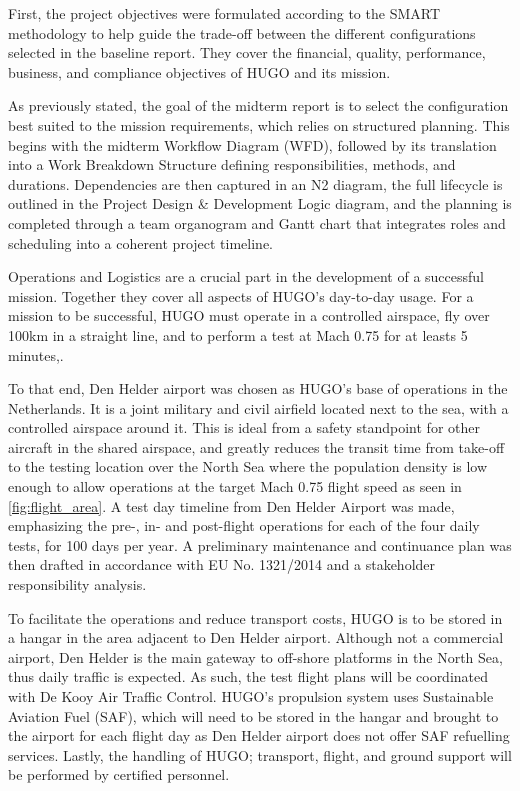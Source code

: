 First, the project objectives were formulated according to the SMART methodology to help guide the trade-off between the different configurations selected in the baseline report. They cover the financial, quality, performance, business, and compliance objectives of HUGO and its mission.

As previously stated, the goal of the midterm report is to select the configuration best suited to the mission requirements, which relies on structured planning. This begins with the midterm Workflow Diagram (WFD), followed by its translation into a Work Breakdown Structure defining responsibilities, methods, and durations. Dependencies are then captured in an N2 diagram, the full lifecycle is outlined in the Project Design \& Development Logic diagram, and the planning is completed through a team organogram and Gantt chart that integrates roles and scheduling into a coherent project timeline.

Operations and Logistics are a crucial part in the development of a successful mission. Together they cover all aspects of HUGO's day-to-day usage. For a mission to be successful, HUGO must operate in a controlled airspace, fly over 100km in a straight line, and to perform a test at Mach 0.75 for at leasts 5 minutes,.

To that end, Den Helder airport was chosen as HUGO's base of operations in the Netherlands. It is a joint military and civil airfield located next to the sea, with a controlled airspace around it. This is ideal from a safety standpoint for other aircraft in the shared airspace, and greatly reduces the transit time from take-off to the testing location over the North Sea where the population density is low enough to allow operations at the target Mach 0.75 flight speed as seen in \autoref{fig:flight_area}. A test day timeline from Den Helder Airport was made, emphasizing the pre-, in- and post-flight operations for each of the four daily tests, for 100 days per year. A preliminary maintenance and continuance plan was then drafted in accordance with EU No. 1321/2014 and a stakeholder responsibility analysis.

To facilitate the operations and reduce transport costs, HUGO is to be stored in a hangar in the area adjacent to Den Helder airport. Although not a commercial airport, Den Helder is the main gateway to off-shore platforms in the North Sea, thus daily traffic is expected. As such, the test flight plans will be coordinated with De Kooy Air Traffic Control. HUGO's propulsion system uses Sustainable Aviation Fuel (SAF), which will need to be stored in the hangar and brought to the airport for each flight day as Den Helder airport does not offer SAF refuelling services. Lastly, the handling of HUGO; transport, flight, and ground support will be performed by certified personnel.

